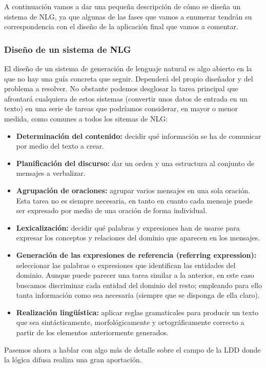 \documentclass[10pt,a4paper]{article}
\begin{document}
A continuación vamos a dar una pequeña descripción de cómo se diseña un sistema de NLG, ya que algunas de las fases que vamos a enumerar tendrán su correspondencia con el diseño de la aplicación final que vamos a comentar.

\subsubsection{Diseño de un sistema de NLG}

El diseño de un sistema de generación de lenguaje natural es algo abierto en la que no hay una guía concreta que seguir. Dependerá del propio diseñador y del problema a resolver. No obstante podemos desglosar la tarea principal que afrontará cualquiera de estos sistemas (convertir unos datos de entrada en un texto) en una serie de tareas que podríamos considerar, en mayor o menor medida, como comunes a todos los sitemas de NLG:

\begin{itemize}
\item \textbf{Determinación del contenido:} decidir qué información se ha de comunicar por medio del texto a crear.
\item \textbf{Planificación del discurso:} dar un orden y una estructura al conjunto de mensajes a verbalizar.
\item \textbf{Agrupación de oraciones:} agrupar varios mensajes en una sola oración. Esta tarea no es siempre necesaria, en tanto en cuanto cada mensaje puede ser expresado por medio de una oración de forma individual.
\item \textbf{Lexicalización:} decidir qué palabras y expresiones han de usarse para expresar los conceptos y relaciones del dominio que aparecen en los mensajes.
\item \textbf{Generación de las expresiones de referencia (referring expression):} seleccionar las palabras o expresiones que identifican las entidades del dominio. Aunque puede parecer una tarea similar a la anterior, en este caso buscamos discriminar cada entidad del dominio del resto; empleando para ello tanta información como sea necesaria (siempre que se disponga de ella claro).
\item \textbf{Realización lingüística:} aplicar reglas gramaticales para producir un texto que sea sintácticamente, morfológicamente y ortográficamente correcto a partir de los elementos anteriormente generados.
\end{itemize}

Pasemos ahora a hablar con algo más de detalle sobre el campo de la LDD donde la lógica difusa realiza una gran aportación.
\end{document}
